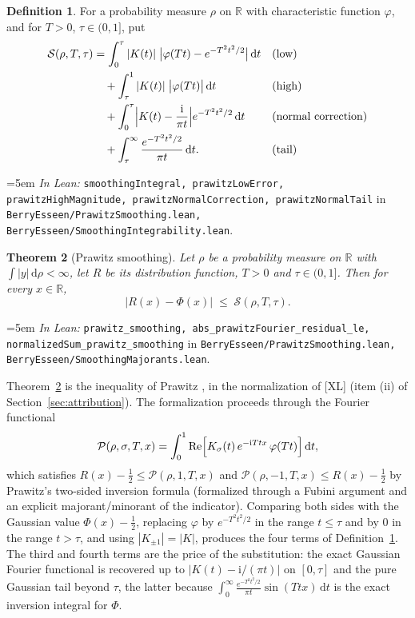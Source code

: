 \documentclass[11pt,a4paper]{article}
\newtheorem{theorem}{Theorem}[section]
\theoremstyle{definition}
\newtheorem{definition}[theorem]{Definition}
\newcommand{\RR}{\mathbb{R}}
\newcommand{\ii}{\mathrm{i}}
\newcommand{\dd}{\,\mathrm{d}}
\newcommand{\Lean}[1]{\texttt{#1}}
\newcommand{\file}[1]{\texttt{#1}}
\newcommand{\formal}[2]{%
  \par\smallskip
  \begingroup\small\raggedright\emergencystretch=5em
  \noindent\textit{In Lean:} \Lean{#1} in \file{#2}.\par
  \endgroup\smallskip}
\begin{document}
\begin{definition}
  \label{def:smoothing}
  For a probability measure $\rho$ on $\RR$ with characteristic function
  $\varphi$, and for $T>0$, $\tau\in(0,1]$, put
  \begin{align*}
    \mathcal S(\rho,T,\tau)
    &= \int_0^\tau |K(t)|\;\bigl|\varphi(Tt)-e^{-T^2t^2/2}\bigr|\dd t
    && \text{(low)}\\
    &\quad+\int_\tau^1 |K(t)|\;\bigl|\varphi(Tt)\bigr|\dd t
    && \text{(high)}\\
    &\quad+\int_0^\tau \Bigl|K(t)-\frac{\ii}{\pi t}\Bigr| e^{-T^2t^2/2}\dd t
    && \text{(normal correction)}\\
    &\quad+\int_\tau^\infty \frac{e^{-T^2t^2/2}}{\pi t}\dd t .
    && \text{(tail)}
  \end{align*}
\end{definition}
\formal{smoothingIntegral, prawitzLowError, prawitzHighMagnitude, prawitzNormalCorrection, prawitzNormalTail}{BerryEsseen/PrawitzSmoothing.lean, BerryEsseen/SmoothingIntegrability.lean}

\begin{theorem}[Prawitz smoothing]
  \label{thm:prawitz}
  Let $\rho$ be a probability measure on $\RR$ with $\int|y|\dd\rho<\infty$, let
  $R$ be its distribution function, $T>0$ and $\tau\in(0,1]$. Then for every
  $x\in\RR$,
  \[
    \bigl|R(x)-\Phi(x)\bigr|\;\le\;\mathcal S(\rho,T,\tau) .
  \]
\end{theorem}
\formal{prawitz\_smoothing, abs\_prawitzFourier\_residual\_le, normalizedSum\_prawitz\_smoothing}{BerryEsseen/PrawitzSmoothing.lean, BerryEsseen/SmoothingMajorants.lean}

Theorem~\ref{thm:prawitz} is the inequality of Prawitz \cite{Prawitz1972}, in the
normalization of [XL] (item (ii) of Section~\ref{sec:attribution}). The
formalization proceeds through the Fourier functional
\[
  \mathcal P(\rho,\sigma,T,x)=\int_0^1
  \operatorname{Re}\Bigl[K_\sigma(t)\,e^{-\ii Ttx}\,\varphi(Tt)\Bigr]\dd t ,
\]
which satisfies $R(x)-\tfrac12\le\mathcal P(\rho,1,T,x)$ and
$\mathcal P(\rho,-1,T,x)\le R(x)-\tfrac12$ by Prawitz's two-sided inversion
formula (formalized through a Fubini argument and an explicit majorant/minorant
of the indicator). Comparing both sides with the Gaussian value
$\Phi(x)-\tfrac12$, replacing $\varphi$ by $e^{-T^2t^2/2}$ in the range
$t\le\tau$ and by $0$ in the range $t>\tau$, and using
$|K_{\pm1}|=|K|$, produces the four terms of Definition~\ref{def:smoothing}. The
third and fourth terms are the price of the substitution: the exact Gaussian
Fourier functional is recovered up to
$|K(t)-\ii/(\pi t)|$ on $[0,\tau]$ and the pure Gaussian tail beyond $\tau$,
the latter because $\int_0^\infty \frac{e^{-T^2t^2/2}}{\pi t}\sin(Ttx)\dd t$ is
the exact inversion integral for $\Phi$.
\end{document}
